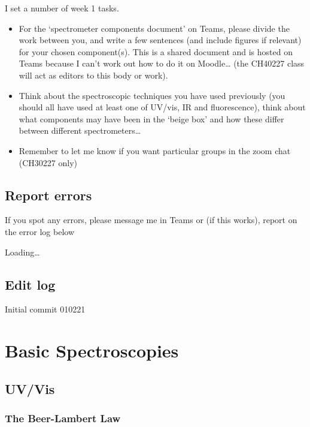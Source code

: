 \documentclass[
]{book}
\begin{document}
I set a number of week 1 tasks.

\begin{itemize}
\item
  For the `spectrometer components document' on Teams, please divide the work between you, and write a few sentences (and include figures if relevant) for your chosen component(s). This is a shared document and is hosted on Teams because I can't work out how to do it on Moodle\ldots{} (the CH40227 class will act as editors to this body or work).
\item
  Think about the spectroscopic techniques you have used previously (you should all have used at least one of UV/vis, IR and fluorescence), think about what components may have been in the `beige box' and how these differ between different spectrometers\ldots{}
\item
  Remember to let me know if you want particular groups in the zoom chat (CH30227 only)
\end{itemize}

\hypertarget{report-errors}{%
\section*{Report errors}\label{report-errors}}

If you spot any errors, please message me in Teams or (if this works), report on the error log below

Loading\ldots{}

\hypertarget{edit-log}{%
\section*{Edit log}\label{edit-log}}

Initial commit 010221

\hypertarget{ch:UVvisfluorIR}{%
\chapter{Basic Spectroscopies}\label{ch:UVvisfluorIR}}

\hypertarget{sec:UV}{%
\section{UV/Vis}\label{sec:UV}}

\hypertarget{the-beer-lambert-law}{%
\subsection{The Beer-Lambert Law}\label{the-beer-lambert-law}}
\end{document}
